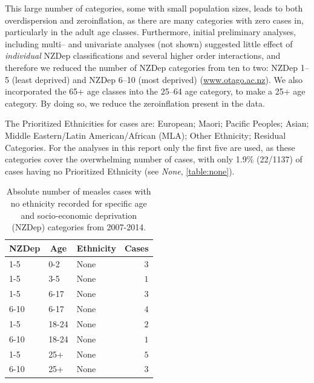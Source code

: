 \documentclass{article}
\begin{document}





This large number of categories, some with small population sizes, leads to both overdispersion and zeroinflation, as there are many categories with zero cases in, particularly in the adult age classes. Furthermore, initial preliminary analyses, including multi-- and univariate analyses (not shown) suggested little effect of \textit{individual} NZDep classifications and several higher order interactions, and therefore we reduced the number of NZDep categories from ten to two: NZDep 1--5 (least deprived) and NZDep 6--10 (most deprived) (\href{http://www.otago.ac.nz/wellington/research/hirp/otago020194.html}{www.otago.ac.nz}). We also incorporated the 65+ age classes into the 25--64 age category, to make a 25+ age category. By doing so, we reduce the zeroinflation present in the data. 

The Prioritized Ethnicities for cases are:  European; Maori; Pacific Peoples; Asian; Middle Eastern/Latin American/African (MLA); Other Ethnicity; Residual Categories. For the analyses in this report only the first five are used, as these categories cover the overwhelming number of cases, with only 1.9\% (22/1137) of cases having no Prioritized Ethnicity (see \emph{None}, \autoref{table:none}). 

\begin{table}[hbtp]
\footnotesize
\begin{center}
\begin{tabular}{lllr}
\hline\hline
\multicolumn{1}{c}{NZDep}&\multicolumn{1}{c}{Age}&\multicolumn{1}{c}{Ethnicity}&\multicolumn{1}{c}{Cases}\tabularnewline
\hline
1-5&0-2&None&$3$\tabularnewline
1-5&3-5&None&$1$\tabularnewline
1-5&6-17&None&$3$\tabularnewline
6-10&6-17&None&$4$\tabularnewline
1-5&18-24&None&$2$\tabularnewline
6-10&18-24&None&$1$\tabularnewline
1-5&25+&None&$5$\tabularnewline
6-10&25+&None&$3$\tabularnewline
\hline
\end{tabular}\end{center}\caption{Absolute number of measles cases with no ethnicity recorded for specific age and socio-economic deprivation (NZDep) categories from 2007-2014.}
\label{table:none}
\end{table}
\end{document}
